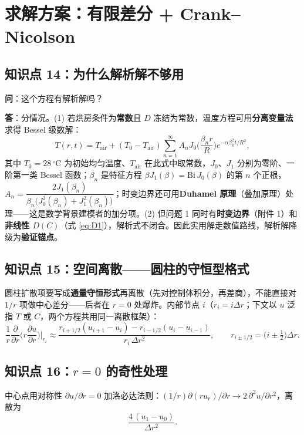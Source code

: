 \documentclass[12pt,a4paper]{ctexart}
\begin{document}
\section{求解方案：有限差分 + Crank--Nicolson}

\subsection{知识点 14：为什么解析解不够用}

\textbf{问}：这个方程有解析解吗？

\textbf{答}：分情况。(1) 若烘房条件为\textbf{常数}且 $D$ 冻结为常数，温度方程可用\textbf{分离变量法}求得 Bessel 级数解：
\begin{equation}
T(r,t)=T_{\mathrm{air}}+(T_0-T_{\mathrm{air}})\sum_{n=1}^{\infty}A_n J_0\!\Big(\frac{\beta_n r}{R}\Big)e^{-\alpha\beta_n^2 t/R^2},
\end{equation}
其中 $T_0=28\,^\circ$C 为初始均匀温度、$T_{\mathrm{air}}$ 在此式中取常数，$J_0$、$J_1$ 分别为零阶、一阶第一类 Bessel 函数；$\beta_n$ 是特征方程 $\beta J_1(\beta)=\mathrm{Bi}\,J_0(\beta)$ 的第 $n$ 个正根，$A_n=\dfrac{2J_1(\beta_n)}{\beta_n\big(J_0^2(\beta_n)+J_1^2(\beta_n)\big)}$；时变边界还可用\textbf{Duhamel 原理}（叠加原理）处理——这是数学背景建模者的加分项。(2) 但问题 1 同时有\textbf{时变边界}（附件 1）和\textbf{非线性 $D(C)$}（式 \eqref{eq:D1}），解析式不闭合。因此实用解走数值路线，解析解降级为\textbf{验证锚点}。

\subsection{知识点 15：空间离散——圆柱的守恒型格式}

圆柱扩散项要写成\textbf{通量守恒形式}再离散（先对控制体积分，再差商），不能直接对 $1/r$ 项做中心差分——后者在 $r=0$ 处爆炸。内部节点 $i$（$r_i=i\Delta r$；下文以 $u$ 泛指 $T$ 或 $C$，两个方程共用同一离散框架）：
\begin{equation}
\frac{1}{r}\frac{\partial}{\partial r}\bigg(r\frac{\partial u}{\partial r}\bigg)\bigg|_{r_i}\approx
\frac{r_{i+1/2}(u_{i+1}-u_i)-r_{i-1/2}(u_i-u_{i-1})}{r_i\,\Delta r^2},\qquad r_{i\pm1/2}=\big(i\pm\tfrac12\big)\Delta r.
\end{equation}

\subsection{知识点 16：$r=0$ 的奇性处理}

中心点用对称性 $\partial u/\partial r=0$ 加洛必达法则：$(1/r)\partial(ru_r)/\partial r\to 2\,\partial^2u/\partial r^2$，离散为
\begin{equation}
\frac{4\,(u_1-u_0)}{\Delta r^2}.
\end{equation}
\end{document}
